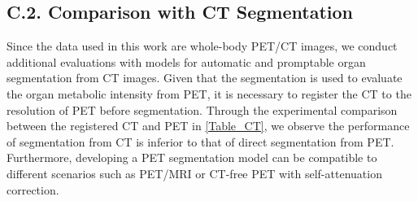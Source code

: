 \subsection*{C.2. Comparison with CT Segmentation}

Since the data used in this work are whole-body PET/CT images, we conduct additional evaluations with models for automatic and promptable organ segmentation from CT images.
Given that the segmentation is used to evaluate the organ metabolic intensity from PET, it is necessary to register the CT to the resolution of PET before segmentation. Through the experimental comparison between the registered CT and PET in \cref{Table_CT}, we observe the performance of segmentation from CT is inferior to that of direct segmentation from PET.
Furthermore, developing a PET segmentation model can be compatible to different scenarios such as PET/MRI or CT-free PET with self-attenuation correction.

